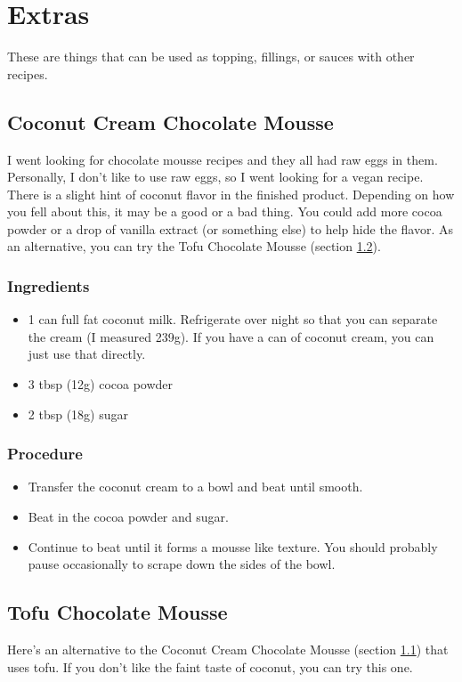 \documentclass[10pt, openany]{book}
\begin{document}
\chapter{Extras}
These are things that can be used as topping, fillings, or sauces with other recipes.

\section{Coconut Cream Chocolate Mousse}
\label{extra:CCChocolateMousse}
I went looking for chocolate mousse recipes and they all had raw eggs in them.  Personally, I don't like to use raw eggs, so I went looking for a vegan recipe.  There is a slight hint of coconut flavor in the finished product.  Depending on how you fell about this, it may be a good or a bad thing.  You could add more cocoa powder or a drop of vanilla extract (or something else) to help hide the flavor.  As an alternative, you can try the Tofu Chocolate Mousse (section \ref{extra:TofuChocolateMousse}).
\subsection{Ingredients}
\begin{itemize}
  \item 1 can full fat coconut milk.  Refrigerate over night so that you can separate the cream (I measured 239g).  If you have a can of coconut cream, you can just use that directly.
  \item 3 tbsp (12g) cocoa powder
  \item 2 tbsp (18g) sugar
\end{itemize}
\subsection{Procedure}
\begin{itemize}
  \item Transfer the coconut cream to a bowl and beat until smooth.
  \item Beat in the cocoa powder and sugar.
  \item Continue to beat until it forms a mousse like texture.  You should probably pause occasionally to scrape down the sides of the bowl.
\end{itemize}

\section{Tofu Chocolate Mousse}
\label{extra:TofuChocolateMousse}
Here's an alternative to the Coconut Cream Chocolate Mousse (section \ref{extra:CCChocolateMousse}) that uses tofu.  If you don't like the faint taste of coconut, you can try this one.
\end{document}
